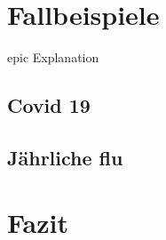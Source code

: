 \documentclass[12pt]{scrartcl} %
\begin{document}








\section{Fallbeispiele}

epic Explanation


\subsection{Covid 19}


\subsection{Jährliche flu}


\newpage
\section{Fazit}


\newpage
\setlength{\bibitemsep}{\baselineskip}
\printbibliography[heading=bibintoc]
\thispagestyle{empty}
\listoffigures
\end{document}
